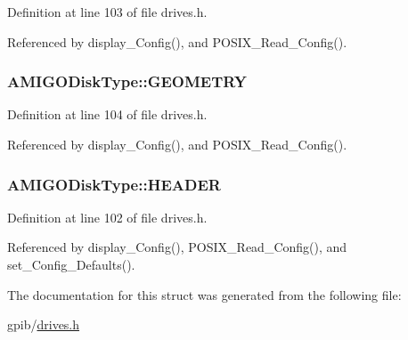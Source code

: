 Definition at line 103 of file drives.\+h.



Referenced by display\+\_\+\+Config(), and P\+O\+S\+I\+X\+\_\+\+Read\+\_\+\+Config().

\subsubsection[{\texorpdfstring{G\+E\+O\+M\+E\+T\+RY}{GEOMETRY}}]{ A\+M\+I\+G\+O\+Disk\+Type\+::\+G\+E\+O\+M\+E\+T\+RY}\hypertarget{structAMIGODiskType_aa75cfbfabf8081ff7bca08cf87af4da8}{}\label{structAMIGODiskType_aa75cfbfabf8081ff7bca08cf87af4da8}


Definition at line 104 of file drives.\+h.



Referenced by display\+\_\+\+Config(), and P\+O\+S\+I\+X\+\_\+\+Read\+\_\+\+Config().

\subsubsection[{\texorpdfstring{H\+E\+A\+D\+ER}{HEADER}}]{ A\+M\+I\+G\+O\+Disk\+Type\+::\+H\+E\+A\+D\+ER}\hypertarget{structAMIGODiskType_a9814efe6f564b104fc7e0100231908a8}{}\label{structAMIGODiskType_a9814efe6f564b104fc7e0100231908a8}


Definition at line 102 of file drives.\+h.



Referenced by display\+\_\+\+Config(), P\+O\+S\+I\+X\+\_\+\+Read\+\_\+\+Config(), and set\+\_\+\+Config\+\_\+\+Defaults().



The documentation for this struct was generated from the following file\+:\begin{DoxyCompactItemize}
\item 
gpib/\hyperlink{drives_8h}{drives.\+h}\end{DoxyCompactItemize}
